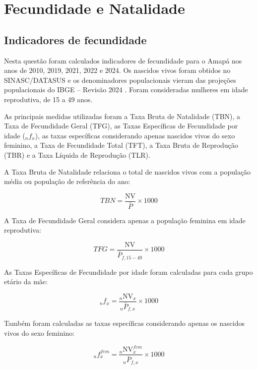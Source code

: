 \section{Fecundidade e Natalidade}

\subsection{Indicadores de fecundidade}

Nesta questão foram calculados indicadores de fecundidade para o Amapá nos anos de 2010, 2019, 2021, 2022 e 2024. Os nascidos vivos foram obtidos no SINASC/DATASUS \cite{datasus2026} e os denominadores populacionais vieram das projeções populacionais do IBGE -- Revisão 2024 \cite{ibge2024}. Foram consideradas mulheres em idade reprodutiva, de 15 a 49 anos.

As principais medidas utilizadas foram a Taxa Bruta de Natalidade (TBN), a Taxa de Fecundidade Geral (TFG), as Taxas Específicas de Fecundidade por idade (${}_nf_x$), as taxas específicas considerando apenas nascidos vivos do sexo feminino, a Taxa de Fecundidade Total (TFT), a Taxa Bruta de Reprodução (TBR) e a Taxa Líquida de Reprodução (TLR).

A Taxa Bruta de Natalidade relaciona o total de nascidos vivos com a população média ou população de referência do ano:

\begin{equation}
\label{eq:tbn}
TBN = \frac{\mathrm{NV}}{\bar{P}} \times 1000
\end{equation}

A Taxa de Fecundidade Geral considera apenas a população feminina em idade reprodutiva:

\begin{equation}
\label{eq:tfg}
TFG = \frac{\mathrm{NV}}{\bar{P}_{f,15-49}} \times 1000
\end{equation}

As Taxas Específicas de Fecundidade por idade foram calculadas para cada grupo etário da mãe:

\begin{equation}
\label{eq:nfx}
{}_nf_x = \frac{{}_n\mathrm{NV}_x}{{}_n\bar{P}_{f,x}} \times 1000
\end{equation}

Também foram calculadas as taxas específicas considerando apenas os nascidos vivos do sexo feminino:

\begin{equation}
\label{eq:nfx_fem}
{}_nf_x^{fem} = \frac{{}_n\mathrm{NV}_x^{fem}}{{}_n\bar{P}_{f,x}} \times 1000
\end{equation}

